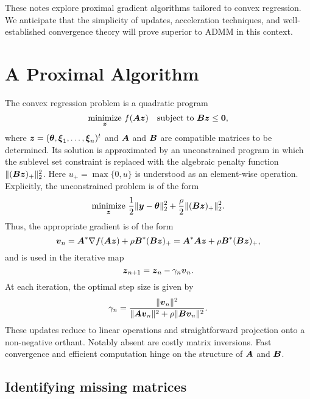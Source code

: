 \documentclass{article}
\begin{document}
These notes explore proximal gradient algorithms tailored to convex regression.
We anticipate that the simplicity of updates, acceleration techniques, and well-established convergence theory will prove superior to ADMM in this context.

\section*{\center A Proximal Algorithm}

The convex regression problem is a quadratic program
\begin{equation*}
    \underset{\boldsymbol{z}}{\mathrm{minimize}}
    ~f(\boldsymbol{A} \boldsymbol{z}) \quad
    \text{subject to}
    ~\boldsymbol{B} \boldsymbol{z} \le \boldsymbol{0},
\end{equation*}
where \(\boldsymbol{z} = (\boldsymbol{\theta}, \boldsymbol{\xi}_{1}, \ldots, \boldsymbol{\xi}_{n})^{t}\) and \(\boldsymbol{A}\) and \(\boldsymbol{B}\) are compatible matrices to be determined.
Its solution is approximated by an unconstrained program in which the sublevel set constraint is replaced with the algebraic penalty function \(\|(\boldsymbol{B} \boldsymbol{z})_{+}\|_{2}^{2}\).
Here \(u_{+} = \max\{0, u\}\) is understood as an element-wise operation.
Explicitly, the unconstrained problem is of the form
\begin{equation*}
    \underset{\boldsymbol{z}}{\mathrm{minimize}}
    ~\frac{1}{2} \|\boldsymbol{y} - \boldsymbol{\theta}\|^{2}_{2}
    + \frac{\rho}{2} \|(\boldsymbol{B} \boldsymbol{z})_{+}\|_{2}^{2}.
\end{equation*}
Thus, the appropriate gradient is of the form
\begin{equation*}
    \boldsymbol{v}_{n}
    =
    \boldsymbol{A}^{\ast} \nabla f(\boldsymbol{A} \boldsymbol{z}) + \rho \boldsymbol{B}^{\ast}(\boldsymbol{B} \boldsymbol{z})_{+}
    =
    \boldsymbol{A}^{\ast} \boldsymbol{A} \boldsymbol{z} + \rho \boldsymbol{B}^{\ast} (\boldsymbol{B} \boldsymbol{z})_{+},
\end{equation*}
and is used in the iterative map
\begin{equation*}
    \boldsymbol{z}_{n+1} = \boldsymbol{z}_{n} - \gamma_{n} \boldsymbol{v}_{n}.
\end{equation*}
At each iteration, the optimal step size is given by
\begin{equation*}
    \gamma_{n}
    =
    \frac{\|\boldsymbol{v}_{n}\|^{2}}{\|\boldsymbol{A} \boldsymbol{v}_{n}\|^{2} + \rho \|\boldsymbol{B} \boldsymbol{v}_{n}\|^{2}}.
\end{equation*}
These updates reduce to linear operations and straightforward projection onto a non-negative orthant.
Notably absent are costly matrix inversions.
Fast convergence and efficient computation hinge on the structure of \(\boldsymbol{A}\) and \(\boldsymbol{B}\).

\subsection*{Identifying missing matrices}
\end{document}
